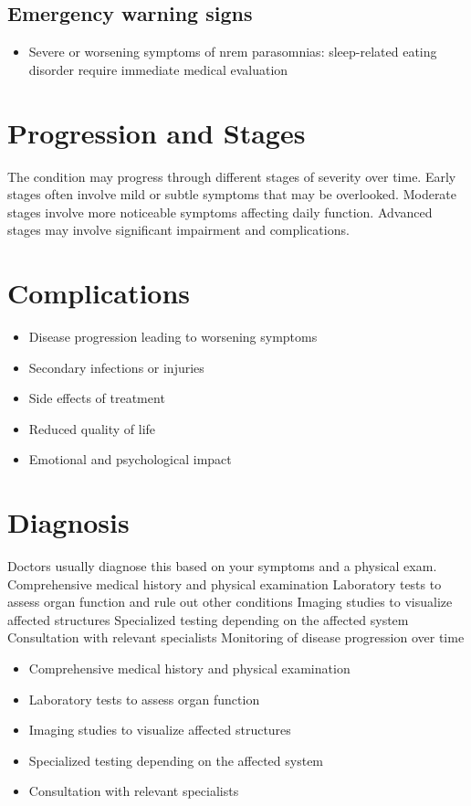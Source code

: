 \subsection{Emergency warning signs}
\begin{itemize}[noitemsep]
  \item Severe or worsening symptoms of nrem parasomnias: sleep-related eating disorder require immediate medical evaluation
\end{itemize}
\section{Progression and Stages}
The condition may progress through different stages of severity over time. Early stages often involve mild or subtle symptoms that may be overlooked. Moderate stages involve more noticeable symptoms affecting daily function. Advanced stages may involve significant impairment and complications.
\section{Complications}
\begin{itemize}[noitemsep]
  \item Disease progression leading to worsening symptoms
  \item Secondary infections or injuries
  \item Side effects of treatment
  \item Reduced quality of life
  \item Emotional and psychological impact
\end{itemize}
\section{Diagnosis}
Doctors usually diagnose this based on your symptoms and a physical exam. Comprehensive medical history and physical examination Laboratory tests to assess organ function and rule out other conditions Imaging studies to visualize affected structures Specialized testing depending on the affected system Consultation with relevant specialists Monitoring of disease progression over time

\begin{itemize}[noitemsep]
  \item Comprehensive medical history and physical examination
  \item Laboratory tests to assess organ function
  \item Imaging studies to visualize affected structures
  \item Specialized testing depending on the affected system
  \item Consultation with relevant specialists
\end{itemize}
